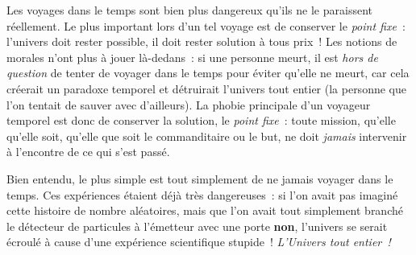{Les voyages dans le temps sont bien plus dangereux qu’ils ne le paraissent réellement.
Le plus important lors d’un tel voyage est de conserver le \emph{point fixe}~:  l’univers doit rester possible, il doit rester solution à tous prix~!
Les notions de morales n’ont plus à jouer là-dedans~:  si une personne meurt, il est \emph{hors de question} de tenter de voyager dans le temps pour éviter qu’elle ne meurt, car cela créerait un paradoxe temporel et détruirait l’univers tout entier (la personne que l’on tentait de sauver avec d’ailleurs).
La phobie principale d’un voyageur temporel est donc de conserver la solution, le \emph{point fixe}~:  toute mission, qu’elle qu’elle soit, qu’elle que soit le commanditaire ou le but, ne doit \emph{jamais} intervenir à l’encontre de ce qui s’est passé.

Bien entendu, le plus simple est tout simplement de ne jamais voyager dans le temps.
Ces expériences étaient déjà très dangereuses~:  si l’on avait pas imaginé cette histoire de nombre aléatoires, mais que l’on avait tout simplement branché le détecteur de particules à l’émetteur avec une porte \textbf{non}, l’univers se serait écroulé à cause d’une expérience scientifique stupide~!
\emph{L’Univers tout entier~!}

}

